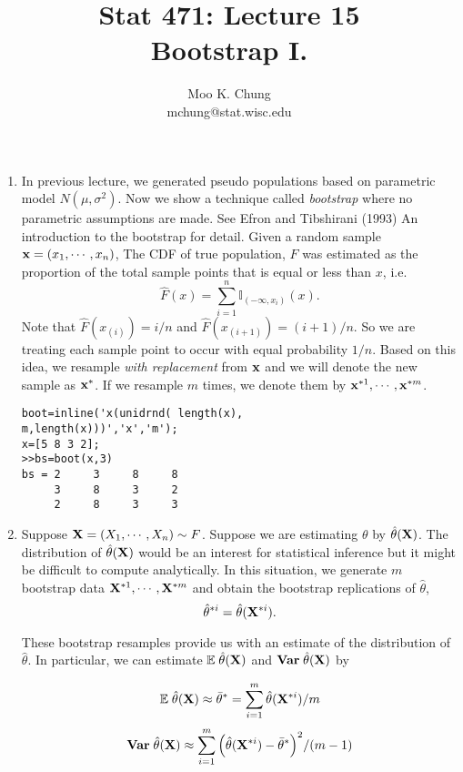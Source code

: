 \documentclass[12pt,twocolumn]{article} %
\begin{document}
\title{Stat 471: Lecture 15\\
Bootstrap I.}
\author{Moo K. Chung\\
mchung@stat.wisc.edu}
\maketitle \thispagestyle{empty}
\begin{enumerate}
\item In previous lecture, we generated pseudo populations based
on parametric model $N(\mu,\sigma^2)$. Now we show a technique
called {\em bootstrap} where no parametric assumptions are made.
See Efron and Tibshirani (1993) An introduction to the bootstrap
for detail. Given a random sample ${\bf x}=(x_1,\cdots,x_n)$, The
CDF of true population, $F$ was estimated as the proportion of the
total sample points that is equal or less than $x$, i.e.
$$\hat F(x) = \sum_{i=1}^n \mathbb{I}_{(-\infty, x_i)}(x).$$
Note that $\hat F(x_{(i)})=i/n$ and $\hat F(x_{(i+1)})=(i+1)/n$.
So we are treating each sample point to occur with equal
probability $1/n$. Based on this idea, we resample {\em with
replacement} from ${\bf x}$ and we will denote the new sample as
${\bf x}^{*}$. If we resample $m$ times, we denote them by ${\bf
x}^{*1}, \cdots, {\bf x}^{*m}$.

\begin{verbatim}
boot=inline('x(unidrnd( length(x),
m,length(x)))','x','m');
x=[5 8 3 2];
>>bs=boot(x,3)
bs = 2     3     8     8
     3     8     3     2
     2     8     3     3
\end{verbatim}

\item Suppose ${\bf X}= (X_1,\cdots,X_n) \sim F$. Suppose we are
estimating $\theta$ by $\hat \theta({\bf X})$. The distribution of
$\hat \theta({\bf X})$ would be an interest for statistical
inference but it might be difficult to compute analytically. In
this situation, we generate $m$ bootstrap data ${\bf
X}^{*1},\cdots, {\bf X}^{*m}$ and obtain the bootstrap
replications of $\hat \theta$, $$\hat \theta^{*i} = \hat
\theta({\bf X}^{*i}).$$

These bootstrap resamples provide us with an estimate of the
distribution of $\hat \theta$. In particular, we can estimate
$\mathbb{E} \; \hat \theta({\bf X})$ and ${\bf Var} \; \hat
\theta({\bf X})$ by

$$\mathbb{E} \; \hat \theta({\bf X}) \approx \bar \theta^*=\sum_{i=1}^m \hat \theta({\bf X}^{*i})/m$$
$${\bf Var} \; \hat \theta({\bf X}) \approx \sum_{i=1}^m \Big(\hat \theta ({\bf X}^{*i}) -
\bar \theta^*\Big)^2/(m-1)$$


\end{enumerate}
\end{document}
